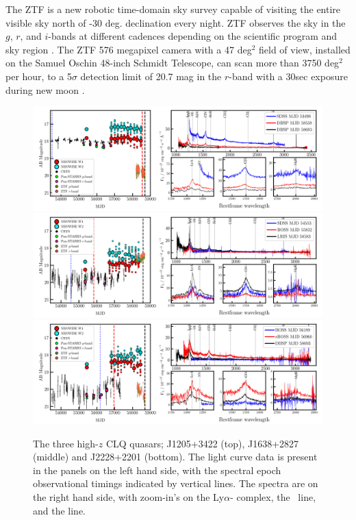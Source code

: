 \documentclass[fleqn,usenatbib]{mnras}
\begin{document}
The ZTF is a new robotic time-domain sky survey capable of visiting
the entire visible sky north of -30 deg. declination every night. ZTF
observes the sky in the $g$, $r$, and $i$-bands at different cadences
depending on the scientific program and sky region
\citep{Bellm2019_ZTFSurveys, Graham2019_ZTF}. The ZTF 576 megapixel
camera with a 47 deg$^{2}$ field of view, installed on the Samuel
Oschin 48-inch Schmidt Telescope, can scan more than 3750 deg$^{2}$
per hour, to a 5$\sigma$ detection limit of 20.7 mag in the $r$-band
with a 30sec exposure during new moon \citep{Masci2019}.
\begin{figure}
  \centering
  \includegraphics[width=16.7cm, trim=0.3cm 0.05cm 0.45cm 0.1cm, clip]
  {figures/J1205+3422_landscape_20191112.png}
  \includegraphics[width=16.7cm, trim=0.3cm 0.05cm 0.40cm 0.1cm, clip]
  {figures/J1638+2827_landscape_20191112.png}
  \includegraphics[width=16.7cm, trim=0.3cm 0.0cm  0.35cm 0.1cm, clip]
  {figures/J2228+2201_landscape_20191112.png}
  \vspace{-12pt}
  \caption[]{The three high-$z$ CLQ quasars; 
    J1205+3422 (top), 
    J1638+2827 (middle) and  
    J2228+2201 (bottom). 
The light curve data is present in the panels on the left hand side, with the 
spectral epoch observational timings indicated by vertical lines. 
The spectra are on the right hand side, with zoom-in's on the Ly$\alpha$-\nv 
complex, the \civ\ line, and the \mgii line. 
  }
  \label{fig:civ_clqs}
\end{figure}
\end{document}
